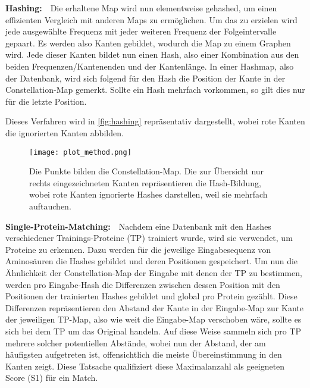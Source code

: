         \vspace{2.25mm}
        \textbf{Hashing:}\ \ Die erhaltene Map wird nun elementweise gehashed, um einen effizienten Vergleich mit anderen Maps zu ermöglichen. Um das zu erzielen wird jede ausgewählte Frequenz mit jeder weiteren Frequenz der Folgeintervalle gepaart. Es werden also Kanten gebildet, wodurch die Map zu einem Graphen wird. Jede dieser Kanten bildet nun einen Hash, also einer Kombination aus den beiden Frequenzen/Kantenenden und der Kantenlänge. In einer Hashmap, also der Datenbank, wird sich folgend für den Hash die Position der Kante in der Constellation-Map gemerkt. Sollte ein Hash mehrfach vorkommen, so gilt dies nur für die letzte Position.

        Dieses Verfahren wird in \autoref{fig:hashing} repräsentativ dargestellt, wobei rote Kanten die ignorierten Kanten abbilden.
        \begin{figure}[h]
            \texttt{[image: plot\_method.png]}
            \caption{Die Punkte bilden die Constellation-Map. Die zur Übersicht nur rechts eingezeichneten Kanten repräsentieren die Hash-Bildung, wobei rote Kanten ignorierte Hashes darstellen, weil sie mehrfach auftauchen.}
            \label{fig:hashing}
        \end{figure}

        \vspace{2.25mm}
        \textbf{Single-Protein-Matching:}\ \ Nachdem eine Datenbank mit den Hashes verschiedener Trainings-Proteine (TP) trainiert wurde, wird sie verwendet, um Proteine zu erkennen. Dazu werden für die jeweilige Eingabesequenz von Aminosäuren die Hashes gebildet und deren Positionen gespeichert. Um nun die Ähnlichkeit der Constellation-Map der Eingabe mit denen der TP zu bestimmen, werden pro Eingabe-Hash die Differenzen zwischen dessen Position mit den Positionen der trainierten Hashes gebildet und global pro Protein gezählt. Diese Differenzen repräsentieren den Abstand der Kante in der Eingabe-Map zur Kante der jeweiligen TP-Map, also wie weit die Eingabe-Map verschoben wäre, sollte es sich bei dem TP um das Original handeln. Auf diese Weise sammeln sich pro TP mehrere solcher potentiellen Abstände, wobei nun der Abstand, der am häufigsten aufgetreten ist, offensichtlich die meiste Übereinstimmung in den Kanten zeigt. Diese Tatsache qualifiziert diese Maximalanzahl als geeigneten Score (S1) für ein Match.

